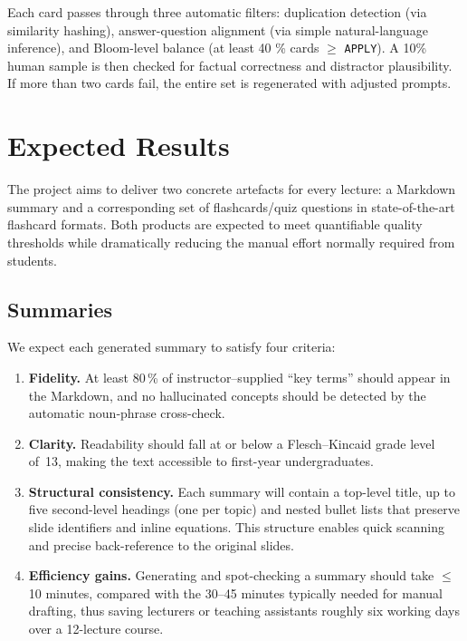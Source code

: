 \documentclass[
12pt,
paper=a4,
,captions=tableheading
]{scrartcl}
\begin{document}
	\pagebreak
	
	Each card passes through three automatic filters: duplication detection (via similarity hashing), answer-question alignment (via simple natural-language inference), and Bloom-level balance (at least 40 \% cards $\geqslant$ \texttt{APPLY}).  A 10\% human sample is then checked for factual correctness and distractor plausibility. If more than two cards fail, the entire set is regenerated with adjusted prompts.
	
	\section{Expected Results}\label{expected-results}
	
	The project aims to deliver two concrete artefacts for every lecture: a Markdown summary and a corresponding set of flashcards/quiz questions in state-of-the-art flashcard formats. Both products are expected to meet quantifiable quality thresholds while dramatically reducing the manual effort normally required from students.

	\subsection{Summaries}\label{results:summaries}

	We expect each generated summary to satisfy four criteria:

	\begin{enumerate}
	\item \textbf{Fidelity.}  At least 80\,\% of instructor–supplied ``key terms'' should appear in the Markdown, and no hallucinated concepts should be detected by the automatic noun‐phrase cross-check.
	\item \textbf{Clarity.}  Readability should fall at or below a Flesch–Kincaid grade level of~13, making the text accessible to first-year undergraduates.
	\item \textbf{Structural consistency.}  Each summary will contain a top-level title, up to five second-level headings (one per topic) and nested bullet lists that preserve slide identifiers and inline equations. This structure enables quick scanning and precise back-reference to the original slides.
	\item \textbf{Efficiency gains.}  Generating and spot-checking a summary should take \(\leq\) 10 minutes, compared with the 30–45 minutes typically needed for manual drafting, thus saving lecturers or teaching assistants roughly six working days over a 12-lecture course.
	\end{enumerate}
	
\end{document}
